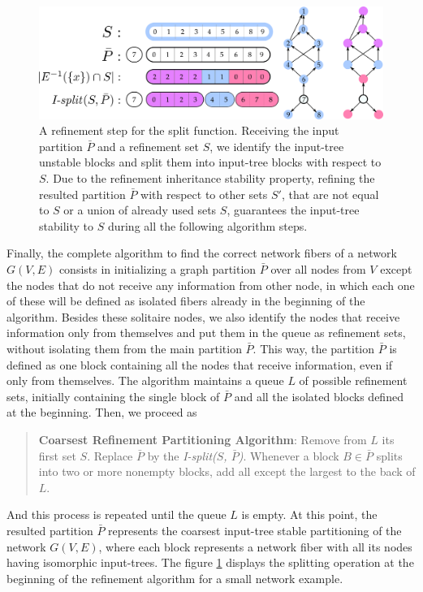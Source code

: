 \documentclass[12pt]{diazessay} %
\begin{document}
\begin{figure}[t]
	\centering
	\includegraphics[scale=0.28]{Figures/split-function.png}
	\caption{A refinement step for the split function. Receiving the input partition $\bar{P}$ and a refinement set $S$, we identify the input-tree unstable blocks and split them into input-tree blocks with respect to $S$. Due to the refinement inheritance stability property, refining the resulted partition $\bar{P}$ with respect to other sets $S'$, that are not equal to $S$ or a union of already used sets $S$, guarantees the input-tree stability to $S$ during all the following algorithm steps.}
	\label{fig:split}
\end{figure}

Finally, the complete algorithm to find the correct network fibers of a network $G(V, E)$ consists in initializing a graph partition $\bar{P}$ over all nodes from $V$ except the nodes that do not receive any information from other node, in which each one of these will be defined as isolated fibers already in the beginning of the algorithm. Besides these solitaire nodes, we also identify the nodes that receive information only from themselves and put them in the queue as refinement sets, without isolating them from the main partition $\bar{P}$. This way, the partition $\bar{P}$ is defined as one block containing all the nodes that receive information, even if only from themselves. The algorithm maintains a queue $L$ of possible refinement sets, initially containing the single block of $\bar{P}$ and all the isolated blocks defined at the beginning. Then, we proceed as
\begin{quotation}
	\textbf{Coarsest Refinement Partitioning Algorithm}: Remove from $L$ its first set $S$. Replace $\bar{P}$ by the \textit{I-split($S$, $\bar{P}$)}. Whenever a block $B \in \bar{P}$ splits into two or more nonempty blocks, add all except the largest to the back of $L$.
\end{quotation}
And this process is repeated until the queue $L$ is empty. At this point, the resulted partition $\bar{P}$ represents the coarsest input-tree stable partitioning of the network $G(V, E)$, where each block represents a network fiber with all its nodes having isomorphic input-trees. The figure \ref{fig:split} displays the splitting operation at the beginning of the refinement algorithm for a small network example.
\end{document}
